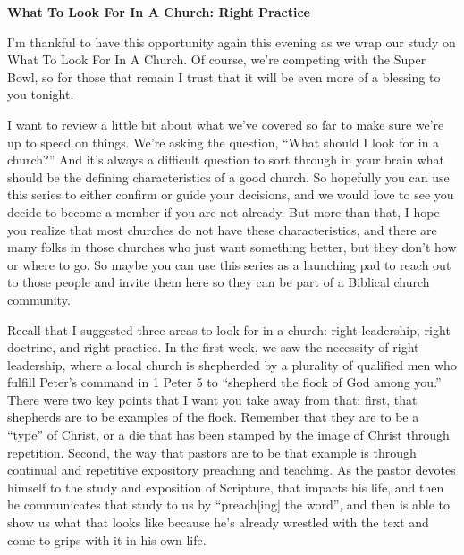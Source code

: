 \documentclass[letterpaper, 12pt]{article}
\begin{document}
    \thispagestyle{empty}

    \begin{center}

        \textbf{\large{What To Look For In A Church: Right Practice}}

    \end{center}

    I'm thankful to have this opportunity again this evening as we wrap
    our study on What To Look For In A Church. Of course, we're
    competing with the Super Bowl, so for those that remain I trust that
    it will be even more of a blessing to you tonight. 

    I want to review a little bit about what we've covered so far to
    make sure we're up to speed on things. We're asking the question,
    ``What should I look for in a church?'' And it's always a difficult
    question to sort through in your brain what should be the defining
    characteristics of a good church. So hopefully you can use this
    series to either confirm or guide your decisions, and we would love
    to see you decide to become a member if you are not already.  But
    more than that, I hope you realize that most churches do not have
    these characteristics, and there are many folks in those churches
    who just want something better, but they don't how or where to go.
    So maybe you can use this series as a launching pad to reach out to
    those people and invite them here so they can be part of a Biblical
    church community.

    Recall that I suggested three areas to look for in a church: right
    leadership, right doctrine, and right practice. In the first week,
    we saw the necessity of right leadership, where a local church is
    shepherded by a plurality of qualified men who fulfill Peter's
    command in 1 Peter 5 to ``shepherd the flock of God among you.''
    There were two key points that I want you take away from that:
    first, that shepherds are to be examples of the flock. Remember that
    they are to be a ``type'' of Christ, or a die that has been stamped
    by the image of Christ through repetition. Second, the way that
    pastors are to be that example is through continual and repetitive
    expository preaching and teaching. As the pastor devotes himself to
    the study and exposition of Scripture, that impacts his life, and
    then he communicates that study to us by ``preach[ing] the word'',
    and then is able to show us what that looks like because he's
    already wrestled with the text and come to grips with it in his own
    life.
\end{document}
